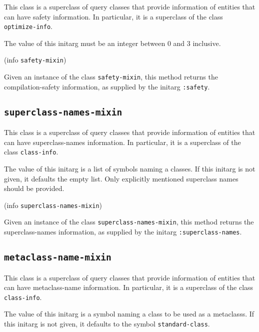 This class is a superclass of query classes that provide information
of entities that can have safety information.  In particular, it is a
superclass of the class \texttt{optimize-info}.


The value of this initarg must be an integer between $0$ and $3$
inclusive.

 {(info {\tt safety-mixin})}

Given an instance of the class \texttt{safety-mixin}, this method
returns the compilation-safety information, as supplied by the initarg
\texttt{:safety}.

\subsection{\texttt{superclass-names-mixin}}
\label{sec-superclass-names-mixin}

This class is a superclass of query classes that provide information
of entities that can have superclass-names information.  In
particular, it is a superclass of the class \texttt{class-info}.


The value of this initarg is a list of symbols naming a classes.  If
this initarg is not given, it defaults the empty list.  Only
explicitly mentioned superclass names should be provided.

 {(info {\tt superclass-names-mixin})}

Given an instance of the class \texttt{superclass-names-mixin}, this
method returns the superclass-names information, as supplied by the
initarg \texttt{:superclass-names}.

\subsection{\texttt{metaclass-name-mixin}}
\label{sec-metaclass-name-mixin}

This class is a superclass of query classes that provide information
of entities that can have metaclass-name information.  In
particular, it is a superclass of the class
\texttt{class-info}.


The value of this initarg is a symbol naming a class to be used as a
metaclasss.  If this initarg is not given, it defaults to the symbol
\texttt{standard-class}.

